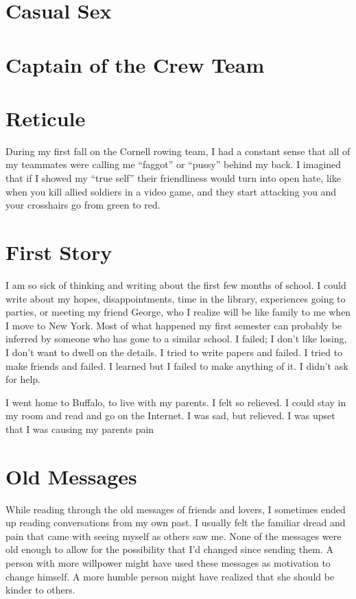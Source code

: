 \documentclass[12pt]{article}
\begin{document}
\section{Casual Sex}

\section{Captain of the Crew Team}

\section{Reticule}
During my first fall on the Cornell rowing team, I had a constant sense that
all of my teammates were calling me ``faggot'' or ``pussy'' behind my back.  I
imagined that if I showed my ``true self'' their friendliness would turn into
open hate, like when you kill allied soldiers in a video game, and they start
attacking you and your crosshairs go from green to red.  


\section{First Story}
I am so sick of thinking and writing about the first few months of school.  I
could write about my hopes, disappointments, time in the library, experiences
going to parties, or meeting my friend George, who I realize will be like family
to me when I move to New York.  Most of what happened my first semester can
probably be inferred by someone who has gone to a similar school.  I failed; I
don't like losing, I don't want to dwell on the details.  I tried to write
papers and failed.  I tried to make friends and failed.  I learned but I failed
to make anything of it.  I didn't ask for help.

I went home to Buffalo, to live with my parents.  I felt so relieved.  I could
stay in my room and read and go on the Internet.  I was sad, but relieved.  I
was upset that I was causing my parents pain

\section{Old Messages}
While reading through the old messages of friends and lovers, I
sometimes ended up reading conversations from my own past.  I usually
felt the familiar dread and pain that came  with seeing myself as others
saw me.  None of the messages were old enough to allow for the
possibility that I'd changed since sending them.  A person with more
willpower might have used these messages as motivation to
change himself.  A more humble person might have realized that she
should be kinder to others.
\end{document}
